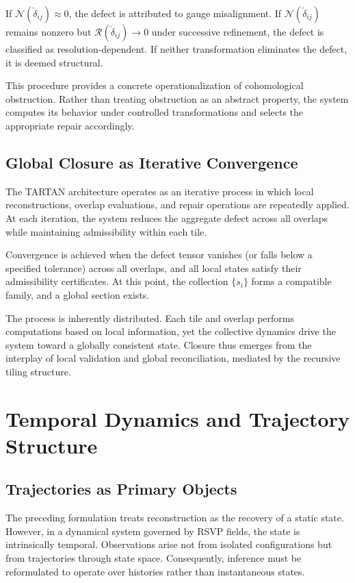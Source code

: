 \documentclass[12pt, oneside]{article}
\begin{document}
If $\mathcal{N}(\check{\delta}_{ij}) \approx 0$, the defect is attributed to gauge misalignment. If $\mathcal{N}(\check{\delta}_{ij})$ remains nonzero but $\mathcal{R}(\check{\delta}_{ij}) \to 0$ under successive refinement, the defect is classified as resolution-dependent. If neither transformation eliminates the defect, it is deemed structural.

This procedure provides a concrete operationalization of cohomological obstruction. Rather than treating obstruction as an abstract property, the system computes its behavior under controlled transformations and selects the appropriate repair accordingly.

\subsection{Global Closure as Iterative Convergence}

The TARTAN architecture operates as an iterative process in which local reconstructions, overlap evaluations, and repair operations are repeatedly applied. At each iteration, the system reduces the aggregate defect across all overlaps while maintaining admissibility within each tile.

Convergence is achieved when the defect tensor vanishes (or falls below a specified tolerance) across all overlaps, and all local states satisfy their admissibility certificates. At this point, the collection $\{s_i\}$ forms a compatible family, and a global section exists.

The process is inherently distributed. Each tile and overlap performs computations based on local information, yet the collective dynamics drive the system toward a globally consistent state. Closure thus emerges from the interplay of local validation and global reconciliation, mediated by the recursive tiling structure.

\section{Temporal Dynamics and Trajectory Structure}

\subsection{Trajectories as Primary Objects}

The preceding formulation treats reconstruction as the recovery of a static state. However, in a dynamical system governed by RSVP fields, the state is intrinsically temporal. Observations arise not from isolated configurations but from trajectories through state space. Consequently, inference must be reformulated to operate over histories rather than instantaneous states.
\end{document}
